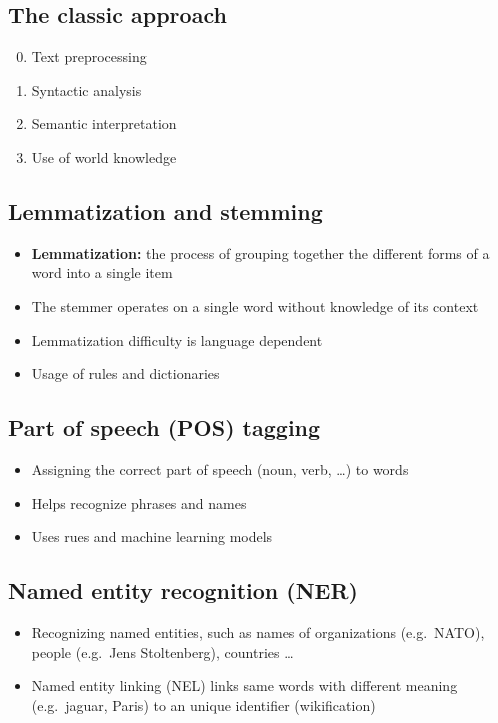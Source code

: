 \documentclass{article}
\begin{document}
    \subsection{The classic approach}
    \begin{enumerate}
        \setcounter{enumi}{-1}
        \item Text preprocessing
        \item Syntactic analysis
        \item Semantic interpretation
        \item Use of world knowledge
    \end{enumerate}

    \subsection{Lemmatization and stemming}
    \begin{itemize}
        \item \textbf{Lemmatization:} the process of grouping together the different forms of a word into a single item
        \item The stemmer operates on a single word without knowledge of its context
        \item Lemmatization difficulty is language dependent
        \item Usage of rules and dictionaries
    \end{itemize}

    \subsection{Part of speech (POS) tagging}
    \begin{itemize}
        \item Assigning the correct part of speech (noun, verb, \ldots) to words
        \item Helps recognize phrases and names
        \item Uses rues and machine learning models
    \end{itemize}

    \subsection{Named entity recognition (NER)}
    \begin{itemize}
        \item Recognizing named entities, such as names of organizations (e.g.\ NATO), people (e.g.\ Jens Stoltenberg), countries \ldots
        \item Named entity linking (NEL) links same words with different meaning (e.g.\ jaguar, Paris) to an unique identifier (wikification)
    \end{itemize}
\end{document}
